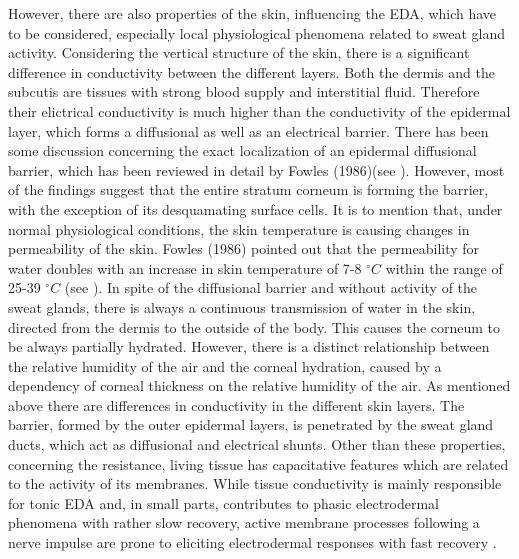 However, there are also properties of the skin, influencing the EDA, which have to be considered, especially local physiological phenomena related to sweat gland activity. Considering the vertical structure of the skin, there is a significant difference in conductivity between the different layers. Both the dermis and the subcutis are tissues with strong blood supply and interstitial fluid. Therefore their elictrical conductivity is much higher than the conductivity of the epidermal layer, which forms a diffusional as well as an electrical barrier. There has been some discussion concerning the exact localization of an epidermal diffusional barrier, which has been reviewed in detail by Fowles (1986)(see \citep{boucsein2013electrodermal}). However, most of the findings suggest that the entire stratum corneum is forming the barrier, with the exception of its desquamating surface cells\citep{boucsein2013electrodermal}. 
It is to mention that, under normal physiological conditions, the skin temperature is causing changes in permeability of the skin. Fowles (1986) pointed out that the permeability for water doubles with an increase in skin temperature of 7-8  $^{\circ}C$  within the range of 25-39 $^{\circ}C$ (see \citep{boucsein2013electrodermal}). In spite of the diffusional barrier and without activity of the sweat glands, there is always a continuous transmission of water in the skin, directed from the dermis to the outside of the body. This causes the corneum to be always partially hydrated. However, there is a distinct relationship between the relative humidity of the air and the corneal hydration, caused by a dependency of corneal thickness on the relative humidity of the air. As mentioned above there are differences in conductivity in the different skin layers. The barrier, formed by the outer epidermal layers, is penetrated by the sweat gland ducts, which act as diffusional and electrical shunts.
Other than these properties, concerning the resistance, living tissue has capacitative features which are related to the activity of its membranes. While tissue conductivity is mainly responsible for tonic EDA and, in small parts, contributes to phasic electrodermal phenomena with rather slow recovery, active membrane processes following a nerve impulse are prone to eliciting electrodermal responses with fast recovery \citep{boucsein2013electrodermal}.

